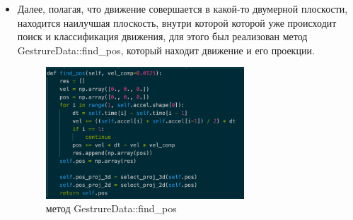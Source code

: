 \begin{itemize}
  \item Далее, полагая, что движение совершается в какой-то двумерной плоскости, находится наилучшая плоскость, внутри которой которой уже происходит поиск и классификация движения, для этого был реализован метод GestrureData::find\_pos, который находит движение и его проекции.
  \begin{figure}[H]
    \begin{center}
        \includegraphics[width=0.7\textwidth]{images/find_pos.png}
    \end{center}
    \caption{метод GestrureData::find\_pos}
  \end{figure}
\end{itemize}

